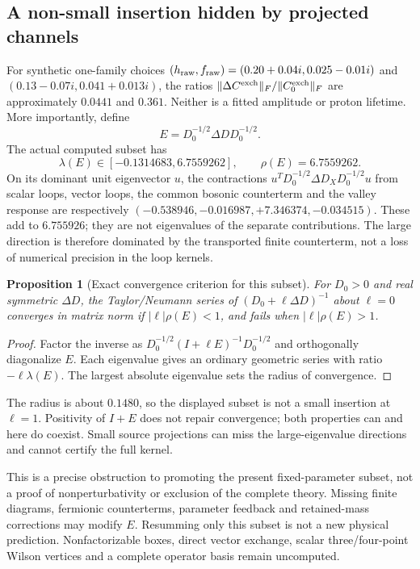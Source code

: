 \documentclass[11pt]{article}
\newtheorem{proposition}{Proposition}
\begin{document}
\subsection{A non-small insertion hidden by projected channels}
For synthetic one-family choices
$(h_{\rm raw},f_{\rm raw})=(0.20+0.04i,0.025-0.01i)$ and
$(0.13-0.07i,0.041+0.013i)$, the ratios
$\|\Delta C^{\rm exch}\|_F/\|C_0^{\rm exch}\|_F$ are approximately
$0.0441$ and $0.361$. Neither is a fitted amplitude or proton lifetime.
More importantly, define
\begin{equation}
 E=D_0^{-1/2}\Delta D D_0^{-1/2}.
\end{equation}
The actual computed subset has
\begin{equation}
 \lambda(E)\in[-0.1314683,6.7559262],\qquad \rho(E)=6.7559262.
 \label{eq:large-insertion}
\end{equation}
On its dominant unit eigenvector $u$, the contractions
$u^TD_0^{-1/2}\Delta D_XD_0^{-1/2}u$ from scalar loops, vector loops,
the common bosonic counterterm and the valley response are respectively
$(-0.538946,-0.016987,+7.346374,-0.034515)$. These add to $6.755926$;
they are not eigenvalues of the separate contributions. The large
direction is therefore dominated by the transported finite counterterm,
not a loss of numerical precision in the loop kernels.
\begin{proposition}[Exact convergence criterion for this subset]
For $D_0>0$ and real symmetric $\Delta D$, the Taylor/Neumann series of
$(D_0+\ell\Delta D)^{-1}$ about $\ell=0$ converges in matrix norm if
$|\ell|\rho(E)<1$, and fails when $|\ell|\rho(E)>1$.
\end{proposition}
\begin{proof}
Factor the inverse as $D_0^{-1/2}(I+\ell E)^{-1}D_0^{-1/2}$ and
orthogonally diagonalize $E$. Each eigenvalue gives an ordinary geometric
series with ratio $-\ell\lambda(E)$. The largest absolute eigenvalue
sets the radius of convergence.
\end{proof}
The radius is about $0.1480$, so the displayed subset is not a small
insertion at $\ell=1$. Positivity of $I+E$ does not repair convergence;
both properties can and here do coexist. Small source projections can
miss the large-eigenvalue directions and cannot certify the full kernel.

This is a precise obstruction to promoting the present fixed-parameter
subset, not a proof of nonperturbativity or exclusion of the complete
theory. Missing finite diagrams, fermionic counterterms, parameter
feedback and retained-mass corrections may modify $E$. Resumming only
this subset is not a new physical prediction. Nonfactorizable boxes,
direct vector exchange, scalar three/four-point Wilson vertices and a
complete operator basis remain uncomputed.
\end{document}
